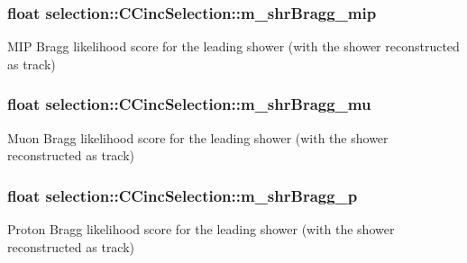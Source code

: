 \subsubsection[{\texorpdfstring{m\+\_\+shr\+Bragg\+\_\+mip}{m_shrBragg_mip}}]{\setlength{\rightskip}{0pt plus 5cm}float selection\+::\+C\+Cinc\+Selection\+::m\+\_\+shr\+Bragg\+\_\+mip\hspace{0.3cm}{\ttfamily [private]}}\hypertarget{classselection_1_1CCincSelection_a0d588b58345d52cc13a398bb3f6ff2fd}{}\label{classselection_1_1CCincSelection_a0d588b58345d52cc13a398bb3f6ff2fd}
M\+IP Bragg likelihood score for the leading shower (with the shower reconstructed as track) 
\subsubsection[{\texorpdfstring{m\+\_\+shr\+Bragg\+\_\+mu}{m_shrBragg_mu}}]{\setlength{\rightskip}{0pt plus 5cm}float selection\+::\+C\+Cinc\+Selection\+::m\+\_\+shr\+Bragg\+\_\+mu\hspace{0.3cm}{\ttfamily [private]}}\hypertarget{classselection_1_1CCincSelection_abe0da2d66394a9583d9540f83a114901}{}\label{classselection_1_1CCincSelection_abe0da2d66394a9583d9540f83a114901}
Muon Bragg likelihood score for the leading shower (with the shower reconstructed as track) 
\subsubsection[{\texorpdfstring{m\+\_\+shr\+Bragg\+\_\+p}{m_shrBragg_p}}]{\setlength{\rightskip}{0pt plus 5cm}float selection\+::\+C\+Cinc\+Selection\+::m\+\_\+shr\+Bragg\+\_\+p\hspace{0.3cm}{\ttfamily [private]}}\hypertarget{classselection_1_1CCincSelection_a9c533f6915b180797d90b4ad789ffb39}{}\label{classselection_1_1CCincSelection_a9c533f6915b180797d90b4ad789ffb39}
Proton Bragg likelihood score for the leading shower (with the shower reconstructed as track) 
